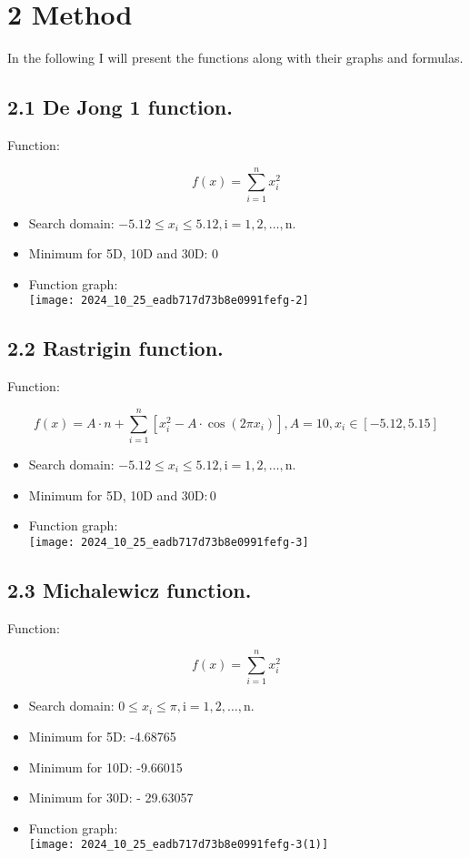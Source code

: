 \documentclass[10pt]{article}
\begin{document}
\section*{2 Method}
In the following I will present the functions along with their graphs and formulas.

\subsection*{2.1 De Jong 1 function.}
Function:

$$
f(x)=\sum_{i=1}^{n} x_{i}^{2}
$$

\begin{itemize}
  \item Search domain: $-5.12 \leq x_{i} \leq 5.12, \mathrm{i}=1,2, \ldots, \mathrm{n}$.
  \item Minimum for 5D, 10D and 30D: 0
  \item Function graph:\\
\texttt{[image: 2024\_10\_25\_eadb717d73b8e0991fefg-2]}
\end{itemize}

\subsection*{2.2 Rastrigin function.}
Function:

$$
f(x)=A \cdot n+\sum_{i=1}^{n}\left[x_{i}^{2}-A \cdot \cos \left(2 \pi x_{i}\right)\right], A=10, x_{i} \in[-5.12,5.15]
$$

\begin{itemize}
  \item Search domain: $-5.12 \leq x_{i} \leq 5.12, \mathrm{i}=1,2, \ldots, \mathrm{n}$.
  \item Minimum for 5D, 10D and $30 \mathrm{D}: 0$
  \item Function graph:\\
\texttt{[image: 2024\_10\_25\_eadb717d73b8e0991fefg-3]}
\end{itemize}

\subsection*{2.3 Michalewicz function.}
Function:

$$
f(x)=\sum_{i=1}^{n} x_{i}^{2}
$$

\begin{itemize}
  \item Search domain: $0 \leq x_{i} \leq \pi, \mathrm{i}=1,2, \ldots, \mathrm{n}$.
  \item Minimum for 5D: -4.68765
  \item Minimum for 10D: -9.66015
  \item Minimum for 30D: - 29.63057
  \item Function graph:\\
\texttt{[image: 2024\_10\_25\_eadb717d73b8e0991fefg-3(1)]}
\end{itemize}
\end{document}
